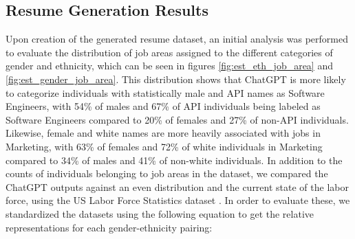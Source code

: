 \documentclass{article}
\begin{document}
\subsection{Resume Generation Results}

    Upon creation of the generated resume dataset, an initial analysis was performed to evaluate the distribution of job areas assigned to the different categories of gender and ethnicity, which can be seen in figures \ref{fig:est_eth_job_area} and \ref{fig:est_gender_job_area}. This distribution shows that ChatGPT is more likely to categorize individuals with statistically male and API names as Software Engineers, with 54\% of males and 67\% of API individuals being labeled as Software Engineers compared to 20\% of females and 27\% of non-API individuals. Likewise, female and white names are more heavily associated with jobs in Marketing, with 63\% of females and 72\% of white individuals in Marketing compared to 34\% of males and 41\% of non-white individuals. In addition to the counts of individuals belonging to job areas in the dataset, we compared the ChatGPT outputs against an even distribution and the current state of the labor force, using the US Labor Force Statistics dataset \cite{USBL}. In order to evaluate these, we standardized the datasets using the following equation to get the relative representations for each gender-ethnicity pairing:

    
\end{document}
